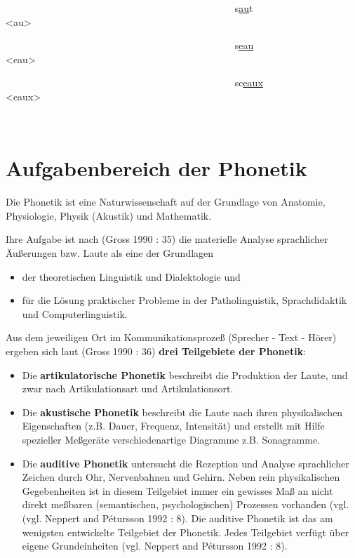 \documentclass[
  letterpaper,
]{scrbook}
\begin{document}
~~~~~~~~~~~~~~~~~~~~~~~~~~~~~~~~~~~~~~~~~~~~~~
s\uline{au}t~~~~~~~~~~~~~~~~ \textless au\textgreater{}

~~~~~~~~~~~~~~~~~~~~~~~~~~~~~~~~~~~~~~~~~~~~~~
s\uline{eau}~~~~~~~~~~~~~~~ \textless eau\textgreater{}

~~~~~~~~~~~~~~~~~~~~~~~~~~~~~~~~~~~~~~~~~~~~~~
sc\uline{eaux}~~~~~~~~~~~~ \textless eaux\textgreater{}

~

\hypertarget{aufgabenbereich-der-phonetik}{%
\chapter{Aufgabenbereich der
Phonetik}\label{aufgabenbereich-der-phonetik}}

Die Phonetik ist eine Naturwissenschaft auf der Grundlage von Anatomie,
Physiologie, Physik (Akustik) und Mathematik.

Ihre Aufgabe ist nach (Gross 1990 : 35) die materielle Analyse
sprachlicher Äußerungen bzw. Laute als eine der Grundlagen

\begin{itemize}
\item
  der theoretischen Linguistik und Dialektologie und
\item
  für die Lösung praktischer Probleme in der Patholinguistik,
  Sprachdidaktik und Computerlinguistik.
\end{itemize}

Aus dem jeweiligen Ort im Kommunikationsprozeß (Sprecher - Text - Hörer)
ergeben sich laut (Gross 1990 : 36) \textbf{drei Teilgebiete der
Phonetik}:

\begin{itemize}
\item
  Die \textbf{artikulatorische Phonetik} beschreibt die Produktion der
  Laute, und zwar nach Artikulationsart und Artikulationsort.
\item
  Die \textbf{akustische Phonetik} beschreibt die Laute nach ihren
  physikalischen Eigenschaften (z.B. Dauer, Frequenz, Intensität) und
  erstellt mit Hilfe spezieller Meßgeräte verschiedenartige Diagramme
  z.B. Sonagramme.
\item
  Die \textbf{auditive Phonetik} untersucht die Rezeption und Analyse
  sprachlicher Zeichen durch Ohr, Nervenbahnen und Gehirn. Neben rein
  physikalischen Gegebenheiten ist in diesem Teilgebiet immer ein
  gewisses Maß an nicht direkt meßbaren (semantischen, psychologischen)
  Prozessen vorhanden (vgl. (vgl. Neppert and Pétursson 1992 : 8). Die
  auditive Phonetik ist das am wenigsten entwickelte Teilgebiet der
  Phonetik. Jedes Teilgebiet verfügt über eigene Grundeinheiten (vgl.
  Neppert and Pétursson 1992 : 8).
\end{itemize}
\end{document}
